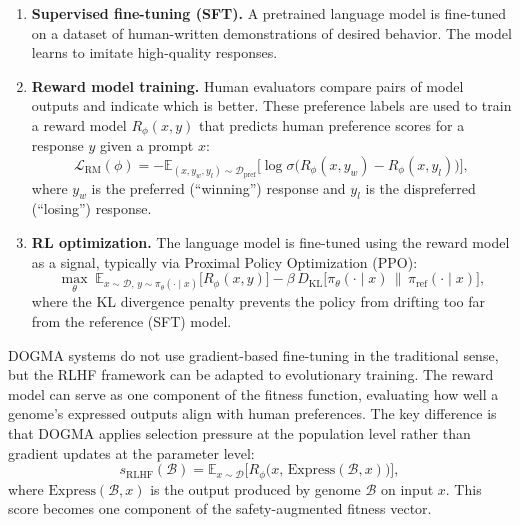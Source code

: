 \begin{enumerate}[leftmargin=1.8em]
  \item \textbf{Supervised fine-tuning (SFT).} A pretrained language model is fine-tuned on a dataset of human-written demonstrations of desired behavior.
  The model learns to imitate high-quality responses.

  \item \textbf{Reward model training.} Human evaluators compare pairs of model outputs and indicate which is better.
  These preference labels are used to train a reward model $R_\phi(x, y)$ that predicts human preference scores for a response $y$ given a prompt $x$:
  \begin{equation}
    \mathcal{L}_{\text{RM}}(\phi) = -\mathbb{E}_{(x, y_w, y_l) \sim \mathcal{D}_{\text{pref}}} \bigl[\log \sigma\bigl(R_\phi(x, y_w) - R_\phi(x, y_l)\bigr)\bigr],
  \end{equation}
  where $y_w$ is the preferred (``winning'') response and $y_l$ is the dispreferred (``losing'') response.

  \item \textbf{RL optimization.} The language model is fine-tuned using the reward model as a signal, typically via Proximal Policy Optimization (PPO):
  \begin{equation}
    \max_\theta \; \mathbb{E}_{x \sim \mathcal{D},\, y \sim \pi_\theta(\cdot \mid x)} \bigl[R_\phi(x, y)\bigr] - \beta \, D_{\mathrm{KL}}\bigl[\pi_\theta(\cdot \mid x) \,\|\, \pi_{\text{ref}}(\cdot \mid x)\bigr],
  \end{equation}
  where the KL divergence penalty prevents the policy from drifting too far from the reference (SFT) model.
\end{enumerate}

\begin{implnote}
DOGMA systems do not use gradient-based fine-tuning in the traditional sense, but the RLHF framework can be adapted to evolutionary training.
The reward model can serve as one component of the fitness function, evaluating how well a genome's expressed outputs align with human preferences.
The key difference is that DOGMA applies selection pressure at the population level rather than gradient updates at the parameter level:
\begin{equation}
  s_{\text{RLHF}}(\mathcal{B}) = \mathbb{E}_{x \sim \mathcal{D}} \bigl[R_\phi\bigl(x,\, \text{Express}(\mathcal{B}, x)\bigr)\bigr],
\end{equation}
where $\text{Express}(\mathcal{B}, x)$ is the output produced by genome $\mathcal{B}$ on input $x$.
This score becomes one component of the safety-augmented fitness vector.
\end{implnote}

